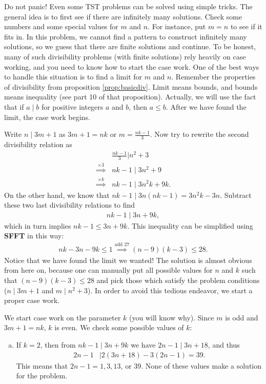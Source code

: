 \documentclass{subfile}
\begin{document}
	\begin{solution}
		Do not panic! Even some TST problems can be solved using simple tricks. The general idea is to first see if there are infinitely many solutions. Check some numbers and some special values for $m$ and $n$. For instance, put $m=n$ to see if it fits in. In this problem, we cannot find a pattern to construct infinitely many solutions, so we guess that there are finite solutions and continue. To be honest, many of such divisibility problems (with finite solutions) rely heavily on case working, and you need to know how to start the case work. One of the best ways to handle this situation is to find a limit for $m$ and $n$. Remember the properties of divisibility from proposition \eqref{prop:basicdiv}. Limit means bounds, and bounds means inequality (see part 10 of that proposition). Actually, we will use the fact that if $a\mid b$ for positive integers $a$ and $b$, then $a \leq b$. After we have found the limit, the case work begins.

		Write $n\mid 3m+1$ as $3m+1=nk$ or $m=\frac{nk-1}{3}$. Now try to rewrite the second divisibility relation as
			\begin{align*}
				& \frac{nk-1}{3} \bigg| n^2 + 3 \\
				\stackrel{\times 3}{\implies} & nk-1\mid 3n^2+9 \\
				\stackrel{\times k}{\implies} & nk-1\mid 3n^2k+9k.
			\end{align*}
		On the other hand, we know that $nk-1\mid 3n(nk-1)=3n^2k-3n$. Subtract these two last divisibility relations to find
			\begin{align*}
				nk-1 \mid 3n+9k,
			\end{align*}
		which in turn implies $nk-1 \leq 3n+9k$. This inequality can be simplified using \textbf{SFFT} in this way:
			\begin{align*}
				nk-3n-9k\leq 1 \stackrel{\text{add }27}{\implies} (n-9)(k-3) \leq 28.
			\end{align*}
		Notice that we have found the limit we wanted! The solution is almost obvious from here on, because one can manually put all possible values for $n$ and $k$ such that $(n-9)(k-3) \leq 28$ and pick those which satisfy the problem conditions ($n\mid 3m+1$ and $m\mid n^2+3$). In order to avoid this tedious endeavor, we start a proper case work.

		We start case work on the parameter $k$ (you will know why). Since $m$ is odd and $3m+1=nk$, $k$ is even. We check some possible values of $k$:
			\begin{enumerate}[(a)]
				\item If $k=2$, then from $nk-1\mid 3n+9k$ we have $2n-1\mid 3n+18$, and thus
					\begin{align*}
						2n-1
							& \mid 2(3n+18)-3(2n-1)=39.
					\end{align*}
				 This means that $2n-1=1, 3, 13$, or $39$. None of these values make a solution for the problem.


\end{enumerate}
\end{solution}
\end{document}
